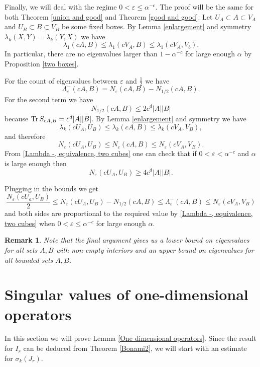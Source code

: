 \documentclass[12pt]{amsart}
\numberwithin{equation}{section}
\newcommand{\eps}{\varepsilon}
\newtheorem{remark}[Thm]{Remark}
\begin{document}
Finally, we will deal with the regime $0 < \eps \le \alpha^{-c}$. The proof will be the same for both Theorem \ref{union and good} and Theorem \ref{good and good}. Let $U_A\subset A \subset V_A$ and $U_B \subset B\subset V_B$ be some fixed boxes. By Lemma \ref{enlargement} and symmetry $\lambda_k(X,Y) = \lambda_k(Y,X)$ we have
\[
\lambda_1(cA, B) \leq \lambda_1(cV_A, B) \leq \lambda_1(c V_A, V_b).
\]
In particular, there are no eigenvalues larger than $1-\alpha^{-c}$ for large enough $\alpha$ by Proposition \ref{two boxes}.

For the count of eigenvalues between $\eps$ and $\frac{1}{2}$ we have
$$\Lambda_\eps^-(cA, B) = N_\eps(cA,B)-N_{1/2}(cA,B).$$
For the second term we have
$$N_{1/2}(cA,B)\le 2c^d |A| |B|$$
because ${\rm{Tr}}\,S_{cA,B} = c^d |A| |B|$. By Lemma \ref{enlargement} and symmetry we have
$$\lambda_k(cU_A, U_B)\le \lambda_k(cA,B)\le \lambda_k(cV_A,V_B),$$
and therefore
$$N_\eps(cU_A, U_B)\le N_\eps(cA,B)\le N _\eps(cV_A,V_B).$$
From \eqref{Lambda -, equivalence, two cubes} one can check that if $0 < \eps < \alpha^{-c}$ and $\alpha$ is large enough then
$$N_\eps(cU_A, U_B) \ge 4c^d |A| |B|.$$

Plugging in the bounds we get
$$\frac{N_\eps(cU_a, U_B)}{2} \le N_\eps(cU_A, U_B)-N_{1/2}(cA,B) \le \Lambda_\eps^-(cA, B)\le N_\eps(cV_A, V_B)$$
and both sides are proportional to the required value by \eqref{Lambda -, equivalence, two cubes} when $0 < \eps \le \alpha^{-c}$ for large enough $\alpha$.
\begin{remark}
Note that the final argument gives us a lower bound on eigenvalues for all sets $A, B$ with non-empty interiors and an upper bound on eigenvalues for all bounded sets $A, B$.
\end{remark}












\section{Singular values of one-dimensional operators}
In this section we will prove Lemma \ref{One dimensional operators}. Since the result for $I_r$ can be deduced from Theorem \ref{Bonami2}, we will start with an estimate for $\sigma_k(J_r)$.
\end{document}
